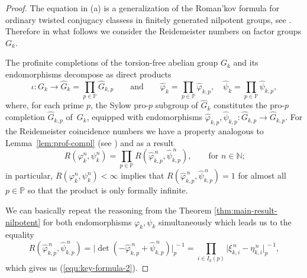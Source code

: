 \documentclass[12pt, a4paper]{amsart}
\begin{document}
\begin{proof}
  The equation in (a) is a generalization of the Roman'kov formula for ordinary twisted conjugacy classess
  in finitely generated nilpotent groups, see \cite[Prop.~2.1]{FelsKlop}.
  Therefore in what follows we consider the Reidemeister numbers on factor groups $G_k$.

  The profinite completions of the torsion-free abelian group $G_k$ and its
  endomorphisms decompose as direct products
  \[
    \iota \colon G_k \to \widehat{G}_k = \prod_{p \in \mathbb{P}} \widehat{G}_{k,p}
    \qquad \text{and} \qquad
    \widehat{\varphi}_k = \prod_{p \in \mathbb{P}} \widehat{\varphi}_{k,p},
    \quad \widehat{\psi}_k = \prod_{p \in \mathbb{P}} \widehat{\psi}_{k,p},
 \]
 where, for each prime $p$, the Sylow pro-$p$ subgroup of
 $\widehat{G}_k$ constitutes the pro-$p$ completion $\widehat{G}_{k,p}$
 of~$G_k$, equipped with endomorphisms
 $\widehat{\varphi}_{k,p}, \widehat{\psi}_{k,p} \colon \widehat{G}_{k,p} \to
 \widehat{G}_{k,p}$.
For the Reidemeister coincidence numbers we have a property analogous to Lemma~\ref{lem:prof-compl}
(see \cite{FelsKlop}) and as a result
 \[
 R(\varphi_k^n,\psi_k^n) = \prod_{p \in \mathbb{P}}
 R(\widehat{\varphi}_{k,p}^{\, n}, \widehat{\psi}_{k,p}^{\, n}), \qquad
 \text{for $n \in \mathbb{N}$;}
 \]
 in particular, $R(\varphi_k^n,\psi_k^n) < \infty$ implies that
 $R(\widehat{\varphi}_{k,p}^{\, n}, \widehat{\psi}_{k,p}^{\, n}) = 1$ for
 almost all $p \in \mathbb{P}$ so that the product is only formally
 infinite.

 We can basically repeat the reasoning from the Theorem \ref{thm:main-result-nilpotent} for both endomorphisms $\varphi_k, \psi_k$ simultaneously
 which leads us to the equality
 \[
  R(\widehat{\varphi}_{k,p}^{\, n},\widehat{\psi}_{k,p}^{\, n}) = \lvert
  \det(- \widehat{\varphi}_{k,p}^{\, n} + \widehat{\psi}_{k,p}^{\, n})
  \rvert_p^{\, -1} = \prod_{i \in I_k(p)} \lvert \xi_{k,i}^{\, n} -
  \eta_{k,i}^{\, n} \rvert_p^{\, -1},
\]
 which gives us (\ref{equ:key-formula-2}).


\end{proof}
\end{document}
